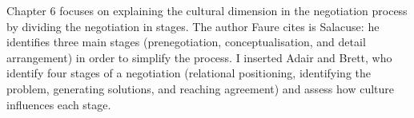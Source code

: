 ﻿\documentclass[../main.tex]{subfiles}
\begin{document}
Chapter 6 focuses on explaining the cultural dimension in the negotiation process
by dividing the negotiation in stages. 
The author Faure cites is Salacuse: he identifies three main stages (prenegotiation, conceptualisation, and detail arrangement) in order to simplify  the process.
I inserted Adair and Brett, who identify four stages of a negotiation (relational positioning, identifying the problem, generating solutions, and reaching agreement) and assess how culture influences each stage.





\end{document}
